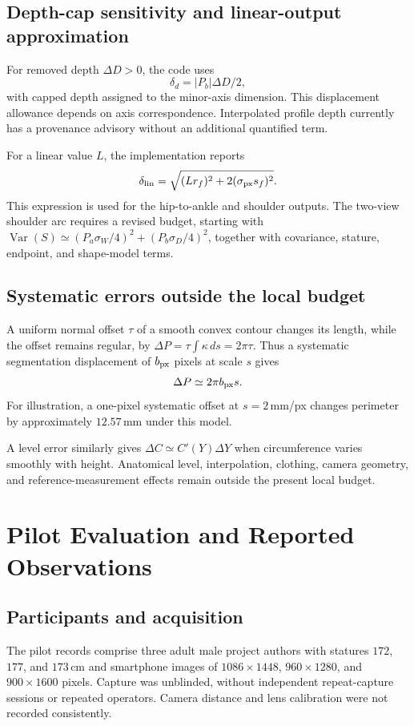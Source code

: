 \documentclass[11pt,a4paper]{article}
\numberwithin{equation}{section}
\begin{document}
\subsection{Depth-cap sensitivity and linear-output approximation}
For removed depth $\Delta D>0$, the code uses
\begin{equation}
\delta_d=|P_b|\Delta D/2,
\end{equation}
with capped depth assigned to the minor-axis dimension. This displacement allowance depends on axis correspondence. Interpolated profile depth currently has a provenance advisory without an additional quantified term.

For a linear value $L$, the implementation reports
\begin{equation}
\delta_{\rm lin}=\sqrt{(Lr_f)^2+2(\sigma_{\rm px}s_f)^2}.
\end{equation}
This expression is used for the hip-to-ankle and shoulder outputs. The two-view shoulder arc requires a revised budget, starting with $\operatorname{Var}(S)\simeq(P_a\sigma_W/4)^2+(P_b\sigma_D/4)^2$, together with covariance, stature, endpoint, and shape-model terms.




\subsection{Systematic errors outside the local budget}
\label{subsec:systematic_errors}
A uniform normal offset $\tau$ of a smooth convex contour changes its length, while the offset remains regular, by $\Delta P=\tau\int\kappa\,ds=2\pi\tau$. Thus a systematic segmentation displacement of $b_{\rm px}$ pixels at scale $s$ gives
\begin{equation}
\Delta P\simeq2\pi b_{\rm px}s.
\label{eq:boundary_bias}
\end{equation}
For illustration, a one-pixel systematic offset at $s=2$\,mm/px changes perimeter by approximately $12.57$\,mm under this model.

A level error similarly gives $\Delta C\simeq C'(Y)\Delta Y$ when circumference varies smoothly with height. Anatomical level, interpolation, clothing, camera geometry, and reference-measurement effects remain outside the present local budget.

\section{Pilot Evaluation and Reported Observations}
\label{sec:pilot}
\subsection{Participants and acquisition}
The pilot records comprise three adult male project authors with statures $172$, $177$, and $173$\,cm and smartphone images of $1086\times1448$, $960\times1280$, and $900\times1600$ pixels. Capture was unblinded, without independent repeat-capture sessions or repeated operators. Camera distance and lens calibration were not recorded consistently.
\end{document}
